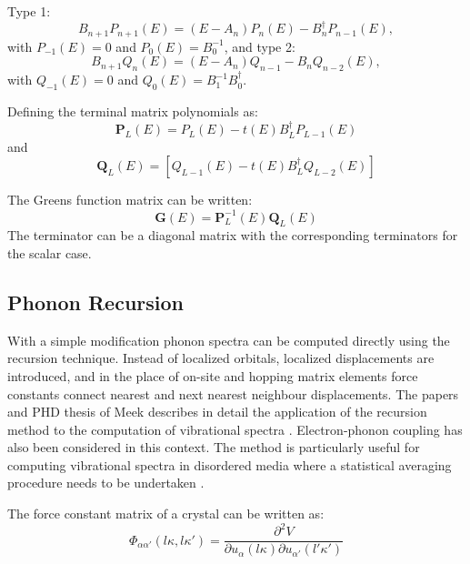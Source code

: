 Type 1:
\begin{equation}
B_{n+1}P_{n+1}(E) = (E-A_{n})P_{n}(E) -B^{\dagger}_{n}P_{n-1}(E),
\end{equation}
with $P_{-1}(E)=0$ and $P_{0}(E)=B_{0}^{-1}$,
and type 2:
%
\begin{equation}
B_{n+1}Q_{n}(E) = (E-A_{n})Q_{n-1} -B_{n}Q_{n-2}(E),
\end{equation}
%
with $Q_{-1}(E)=0$ and $Q_{0}(E)=B_{1}^{-1}B^{\dagger}_{0}$.

Defining the terminal matrix polynomials as:
\begin{equation}
\mathbf{P}_{L}(E) = P_{L}(E) -t(E)B_{L}^{\dagger}P_{L-1}(E)
\end{equation}
and
\begin{equation}
\mathbf{Q}_{L}(E)=[Q_{L-1}(E) -t(E)B_{L}^{\dagger}Q_{L-2}(E)]
\end{equation}

The Greens function matrix can be written:
%
\begin{equation}
\mathbf{G}(E) = \mathbf{P}_{L}^{-1}(E)\mathbf{Q}_{L}(E)
\end{equation}
%
The terminator can be a diagonal matrix with the corresponding
terminators for the scalar case.

\subsection{Phonon Recursion}
With a simple modification phonon spectra can be computed directly 
using the recursion technique. Instead of localized orbitals, localized 
displacements are introduced, and in the place of on-site and hopping
matrix elements force constants connect nearest and next 
nearest neighbour displacements. 
The papers and PHD thesis of Meek describes in detail the 
application of the recursion method to the computation of 
vibrational spectra \cite{meek76, meek78}. Electron-phonon coupling has also been
considered in this context\cite{terakura78}. The method is particularly useful for
computing vibrational spectra in disordered media 
where a statistical averaging procedure needs to be undertaken \cite{mookerjee04}.

The force constant matrix of a crystal can be written as:
%
\begin{equation}
\label{eq:forceconstant}
\Phi_{\alpha\alpha'}(l\kappa,l\kappa') = \frac{\partial^{2}V}{\partial u_{\alpha}(l\kappa) \partial u_{\alpha'}(l'\kappa')}
\end{equation}
%

